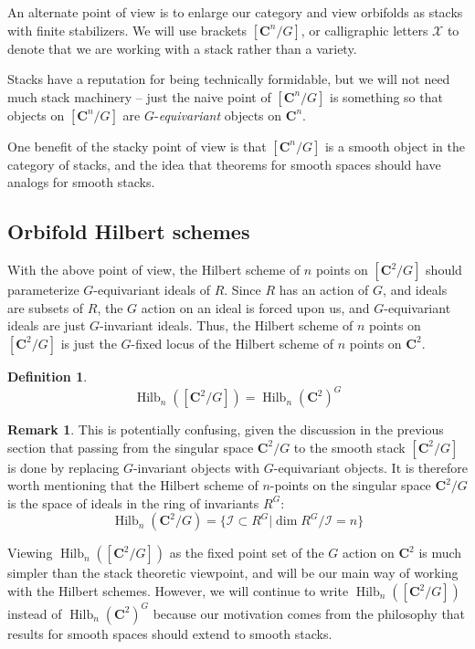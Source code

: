 \documentclass{amsart}[12pt]
\theoremstyle{definition}
\newtheorem{definition}[dummy]{Definition}
\newtheorem{remark}[dummy]{Remark}
\newcommand{\C}{\mathbf{C}}
\newcommand{\II}{\mathcal{I}}
\DeclareMathOperator{\Hilb}{Hilb}
\begin{document}
An alternate point of view is to enlarge our category and view orbifolds as stacks with finite stabilizers.  We will use brackets $[\C^n/G]$, or calligraphic letters $\mathcal{X}$ to denote that we are working with a stack rather than a variety.  

Stacks have a reputation for being technically formidable, but we will not need much stack machinery -- just the naive point of $[\C^n/G]$ is something so that objects on $[\C^n/G]$ are $G$-\emph{equivariant} objects on $\C^n$.  


One benefit of the stacky point of view is that $[\C^n/G]$ is a smooth object in the category of stacks, and the idea that theorems for smooth spaces should have analogs for smooth stacks.


\subsection{Orbifold Hilbert schemes}

With the above point of view, the Hilbert scheme of $n$ points on $[\C^2/G]$ should parameterize $G$-equivariant ideals of $R$.  Since $R$ has an action of $G$, and ideals are subsets of $R$, the $G$ action on an ideal is forced upon us, and $G$-equivariant ideals are just $G$-invariant ideals.  Thus, the Hilbert scheme of $n$ points on $[\C^2/G]$ is just the $G$-fixed locus of the Hilbert scheme of $n$ points on $\C^2$.

\begin{definition}
$$\Hilb_n([\C^2/G])=\Hilb_n(\C^2)^G$$
\end{definition}

\begin{remark}
This is potentially confusing, given the discussion in the previous section that passing from the singular space $\C^2/G$ to the smooth stack $[\C^2/G]$ is done by replacing $G$-invariant objects with $G$-equivariant objects.  It is therefore worth mentioning that the Hilbert scheme of $n$-points on the singular space $\C^2/G$ is the space of ideals in the ring of invariants $R^G$:
$$\Hilb_n(\C^2/G)=\{\II\subset R^G | \dim R^G/\II=n\}$$
\end{remark}

Viewing $\Hilb_n([\C^2/G])$ as the fixed point set of the $G$ action on $\C^2$ is much simpler than the stack theoretic viewpoint, and will be our main way of working with the Hilbert schemes.  However, we will continue to write $\Hilb_n([\C^2/G])$ instead of $\Hilb_n(\C^2)^G$ because our motivation comes from the philosophy that results for smooth spaces should extend to smooth stacks.
\end{document}
